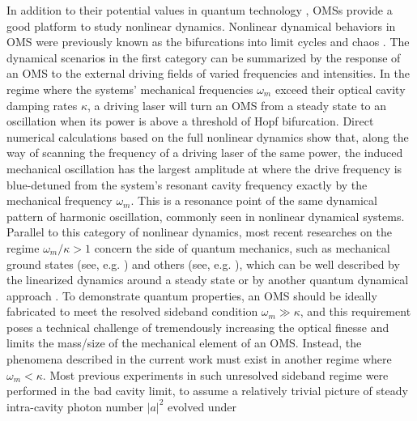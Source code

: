 \documentclass[a4paper,fleqn]{cas-dc}
\begin{document}
In addition to their potential values in quantum technology \cite{aspelmeyer2014cavity,barzanjeh2022optomechanics}, OMSs provide a good platform to study nonlinear dynamics. Nonlinear dynamical behaviors in OMS were previously known as the bifurcations into limit cycles \cite{rokhsari2005radiation,marquardt2006dynamical,zaitsev2011forced,krause2015nonlinear,colombano2019synchronization,sheng2020self,lin2021catastrophic,wang2021passive} and chaos \cite{carmon2005temporal,carmon2007chaotic,ma2014formation,bakemeier2015route,zhu2022cavity}. The dynamical scenarios in the first category can be summarized by the response of an OMS to the external driving fields of varied frequencies and intensities. In the regime where the systems' mechanical frequencies $\omega_m$ exceed their optical cavity damping rates $\kappa$, a driving laser will turn an OMS from a steady state to an oscillation when its power is above a threshold of Hopf bifurcation. Direct numerical calculations based on the full nonlinear dynamics \cite{he2023dynamical} show that, along the way of scanning the frequency of a driving laser of the same power, the induced mechanical oscillation has the largest amplitude at where the drive frequency is blue-detuned from the system's resonant cavity frequency exactly by the mechanical frequency $\omega_m$. This is a resonance point of the same dynamical pattern of harmonic oscillation, commonly seen in nonlinear dynamical systems. Parallel to this category of nonlinear dynamics, most recent researches on the regime $\omega_m/\kappa>1$ concern the side of quantum mechanics, such as mechanical ground states 
(see, e.g. \cite{schliesser2009resolved,teufel2011sideband,chan2011laser}) and others (see, e.g. \cite{purdy2013strong,aggarwal2020room}), which can be well described by the linearized dynamics around a steady state \cite{aspelmeyer2014cavity} or by another quantum dynamical approach \cite{he2023dynamical,he2017radiation}. To demonstrate quantum properties, an OMS should be ideally fabricated to meet the resolved sideband condition $\omega_m\gg \kappa$, and this requirement poses a technical challenge of tremendously increasing the optical finesse and limits the mass/size of the mechanical element of an OMS. Instead, the phenomena described in the current work must exist in another regime where $\omega_m<\kappa$. Most previous experiments in such unresolved sideband regime \cite{doolin2014nonlinear,brawley2016nonlinear,leijssen2017nonlinear,meng2022measurement} were performed in the bad cavity limit, to assume a relatively trivial picture of steady intra-cavity photon number $|a|^2$ evolved under 
\end{document}
